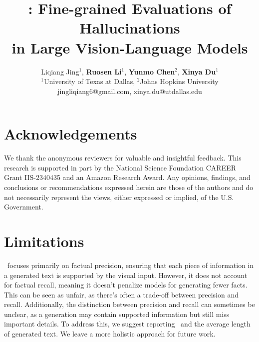 \documentclass[11pt]{article}
\title{\ourstitle: Fine-grained Evaluations of Hallucinations \\ in Large Vision-Language Models}
\author{Liqiang Jing$^1$, {\bf Ruosen Li}$^1$, {\bf Yunmo Chen}$^2$, {\bf Xinya Du}$^1$ \\   $^1$University of Texas at Dallas, $^2$Johns Hopkins University \\ jingliqiang6@gmail.com, xinya.du@utdallas.edu}
\begin{document}
\maketitle

    









\section*{Acknowledgements}
We thank the anonymous reviewers for valuable and insightful feedback.
This research is supported in part by the National Science Foundation CAREER Grant IIS-2340435 and an Amazon Research Award.  Any opinions, findings, and conclusions or recommendations expressed herein are those of the authors and do not necessarily represent the views, either expressed or implied, of the U.S. Government.


\section*{Limitations}

\ours\ focuses primarily on factual precision, ensuring that each piece of information in a generated text is supported by the visual input. However, it does not account for factual recall, meaning it doesn't penalize models for generating fewer facts. This can be seen as unfair, as there's often a trade-off between precision and recall. Additionally, the distinction between precision and recall can sometimes be unclear, as a generation may contain supported information but still miss important details. To address this, we suggest reporting \ours\ and the average length of generated text. We leave a more holistic approach for future work.

%







\end{document}
